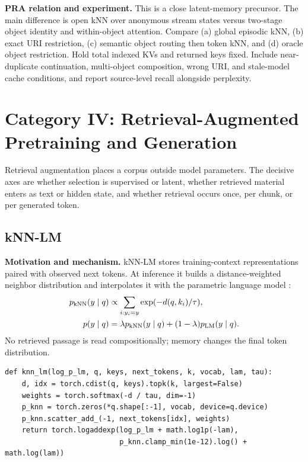 \textbf{PRA relation and experiment.} This is a close latent-memory precursor.  The main
difference is open kNN over anonymous stream states versus two-stage object identity and
within-object attention.  Compare (a) global episodic kNN, (b) exact URI restriction,
(c) semantic object routing then token kNN, and (d) oracle object restriction.  Hold total
indexed KVs and returned keys fixed.  Include near-duplicate continuation, multi-object
composition, wrong URI, and stale-model cache conditions, and report source-level recall
alongside perplexity.

\section{Category IV: Retrieval-Augmented Pretraining and Generation}

Retrieval augmentation places a corpus outside model parameters.  The decisive axes are
whether selection is supervised or latent, whether retrieved material enters as text or
hidden state, and whether retrieval occurs once, per chunk, or per generated token.

\subsection{kNN-LM}

\textbf{Motivation and mechanism.} kNN-LM stores training-context representations paired
with observed next tokens.  At inference it builds a distance-weighted neighbor distribution
and interpolates it with the parametric language model \citep{khandelwal2020knnlm}:
\begin{align}
p_{\rm kNN}(y\mid q)&\propto\sum_{i:y_i=y}
\exp(-d(q,k_i)/\tau),\\
p(y\mid q)&=\lambda p_{\rm kNN}(y\mid q)+(1-\lambda)p_{\rm LM}(y\mid q).
\end{align}
No retrieved passage is read compositionally; memory changes the final token distribution.

\begin{lstlisting}[caption={kNN-LM probability interpolation}]
def knn_lm(log_p_lm, q, keys, next_tokens, k, vocab, lam, tau):
    d, idx = torch.cdist(q, keys).topk(k, largest=False)
    weights = torch.softmax(-d / tau, dim=-1)
    p_knn = torch.zeros(*q.shape[:-1], vocab, device=q.device)
    p_knn.scatter_add_(-1, next_tokens[idx], weights)
    return torch.logaddexp(log_p_lm + math.log1p(-lam),
                           p_knn.clamp_min(1e-12).log() + math.log(lam))
\end{lstlisting}

